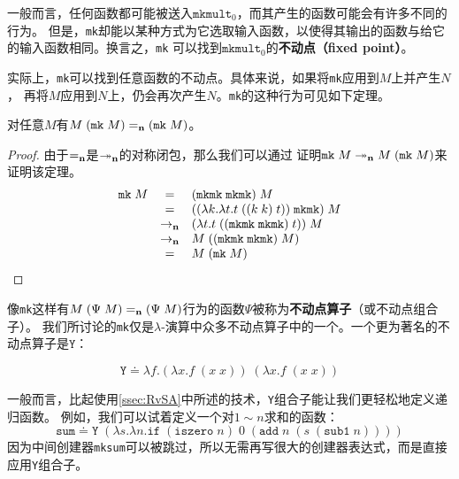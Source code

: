 \documentclass[12pt]{article}
\begin{document}
\indent{}一般而言，任何函数都可能被送入$\texttt{mkmult}_0$，而其产生的函数可能会有许多不同的行为。
但是，\texttt{mk}却能以某种方式为它选取输入函数，以使得其输出的函数与给它的输入函数相同。换言之，\texttt{mk}
可以找到$\texttt{mkmult}_0$的\textbf{不动点（fixed point）}。

\indent{}实际上，\texttt{mk}可以找到任意函数的不动点。具体来说，如果将\texttt{mk}应用到$M$上并产生$N$，
再将$M$应用到$N$上，仍会再次产生$N$。\texttt{mk}的这种行为可见如下定理。
\begin{theorem}
对任意$M$有$M\;(\texttt{mk}\;M) =_{\bf{n}} (\texttt{mk}\;M)$。
\end{theorem}
\begin{proof}
由于$=_{\bf{n}}$是$\twoheadrightarrow_{\bf{n}}$的对称闭包，那么我们可以通过
证明$\texttt{mk}\;M\twoheadrightarrow_{\bf{n}}M\;(\texttt{mk}\;M)$来证明该定理。
\begin{gather*}
\begin{array}{lcl}
\texttt{mk}\;M
& = & (\texttt{mkmk}\;\texttt{mkmk})\;M\\
& = & ((\lambda{}k.\lambda{}t.t\;((k\;k)\;t))\;\texttt{mkmk})\;M\\
& \rightarrow_{\bf{n}} & (\lambda{}t.t\;((\texttt{mkmk}\;\texttt{mkmk})\;t))\;M\\
& \rightarrow_{\bf{n}} & M\;((\texttt{mkmk}\;\texttt{mkmk})\;M)\\
& = & M\;(\texttt{mk}\;M)
\end{array}
\end{gather*}
\end{proof}

\indent{}像\texttt{mk}这样有$M\;(\Psi\;M)=_{\bf{n}}(\Psi\;M)$行为的函数$\Psi$被称为\textbf{不动点算子}（或不动点组合子）。
我们所讨论的\texttt{mk}仅是$\lambda$-演算中众多不动点算子中的一个。一个更为著名的不动点算子是$\texttt{Y}$：
\begin{tcolorbox}[top=-0.4em,left=0mm,right=0mm,bottom=1mm]
\begin{displaymath}
\texttt{Y} \doteq \lambda{}f.(\lambda{}x.f\;(x\;x))\;(\lambda{}x.f\;(x\;x))
\end{displaymath}
\end{tcolorbox}

\indent{}一般而言，比起使用\:\ref{ssec:RvSA}\:中所述的技术，\texttt{Y}组合子能让我们更轻松地定义递归函数。
例如，我们可以试着定义一个对$1\sim{}n$求和的函数：
\begin{displaymath}
\texttt{sum} \doteq \texttt{Y}\;(\lambda{}s.\lambda{}n.\texttt{if}\;(\texttt{iszero}\;n)\;0\;
(\texttt{add}\;n\;(s\;(\texttt{sub1}\;n))))
\end{displaymath}
\noindent{}因为中间创建器\texttt{mksum}可以被跳过，所以无需再写很大的创建器表达式，而是直接应用\texttt{Y}组合子。
\end{document}
